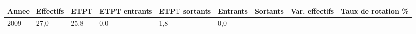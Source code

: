 \begin{longtable}[]{@{}lllllllll@{}}
\toprule
\begin{minipage}[b]{0.05\columnwidth}\raggedright
Annee\strut
\end{minipage} & \begin{minipage}[b]{0.08\columnwidth}\raggedright
Effectifs\strut
\end{minipage} & \begin{minipage}[b]{0.04\columnwidth}\raggedright
ETPT\strut
\end{minipage} & \begin{minipage}[b]{0.10\columnwidth}\raggedright
ETPT entrants\strut
\end{minipage} & \begin{minipage}[b]{0.10\columnwidth}\raggedright
ETPT sortants\strut
\end{minipage} & \begin{minipage}[b]{0.07\columnwidth}\raggedright
Entrants\strut
\end{minipage} & \begin{minipage}[b]{0.07\columnwidth}\raggedright
Sortants\strut
\end{minipage} & \begin{minipage}[b]{0.11\columnwidth}\raggedright
Var. effectifs\strut
\end{minipage} & \begin{minipage}[b]{0.14\columnwidth}\raggedright
Taux de rotation \%\strut
\end{minipage}\tabularnewline
\midrule
\endhead
\begin{minipage}[t]{0.05\columnwidth}\raggedright
2009\strut
\end{minipage} & \begin{minipage}[t]{0.08\columnwidth}\raggedright
27,0\strut
\end{minipage} & \begin{minipage}[t]{0.04\columnwidth}\raggedright
25,8\strut
\end{minipage} & \begin{minipage}[t]{0.10\columnwidth}\raggedright
0,0\strut
\end{minipage} & \begin{minipage}[t]{0.10\columnwidth}\raggedright
1,8\strut
\end{minipage} & \begin{minipage}[t]{0.07\columnwidth}\raggedright
0,0\strut
\end{minipage} & \begin{minipage}[t]{0.07\columnwidth}\raggedright

\end{minipage}
\end{longtable}
